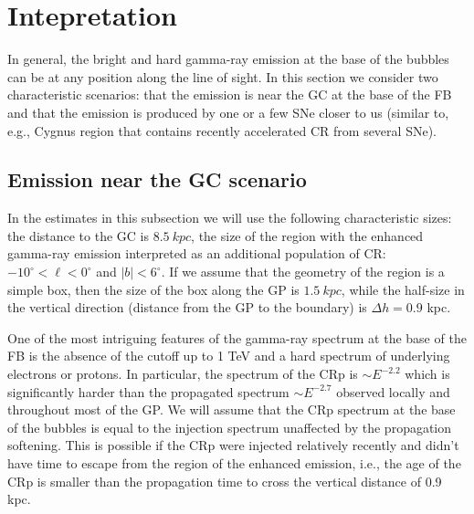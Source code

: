 \section{Intepretation}
\label{sec:Interpretation}

In general, the bright and hard gamma-ray emission at the base of the bubbles can be at any position along the line of sight.
In this section we consider two characteristic scenarios: that the emission is near the GC at the base of the FB and that the emission is 
produced by one or a few SNe closer to us (similar to, e.g., Cygnus region that contains recently accelerated CR from several SNe).

\subsection{Emission near the GC scenario}

In the estimates in this subsection we will use the following characteristic sizes: 
the distance to the GC is $\SI{8.5}{kpc}$, 
the size of the region with the enhanced gamma-ray emission interpreted as an additional population of CR:
$-10^\circ < \ell < 0^\circ$ and $|b| < 6^\circ$.
If we assume that the geometry of the region is a simple box, then the size of the box along the GP is $\SI{1.5}{kpc}$,
while the half-size in the vertical direction (distance from the GP to the boundary) is $\Delta h = 0.9$ kpc.

One of the most intriguing features of the gamma-ray spectrum at the base of the FB is the absence of the cutoff up to 1 TeV and 
a hard spectrum of underlying electrons or protons.
In particular, the spectrum of the CRp is $\sim E^{-2.2}$ which is significantly harder than the propagated spectrum
$\sim E^{-2.7}$ observed locally and throughout most of the GP.
We will assume that the CRp spectrum at the base of the bubbles is equal to the injection spectrum unaffected by the 
propagation softening.
This is possible if the CRp were injected relatively recently and didn't have time to escape from the region of the enhanced emission,
i.e., the age of the CRp is smaller than the propagation time to cross the vertical distance of 0.9 kpc.

